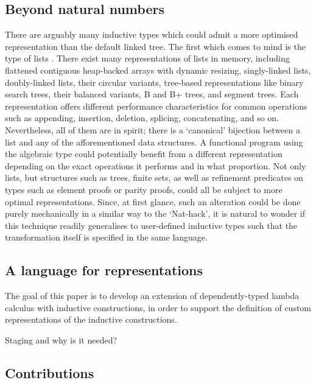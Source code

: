 \subsection{Beyond natural numbers}

There are arguably many inductive types which could admit a more optimised
representation than the default linked tree. The first which comes to mind is
the type of lists . There exist many
representations of lists in memory, including flattened contiguous heap-backed
arrays with dynamic resizing, singly-linked lists, doubly-linked lists, their
circular variants, tree-based representations like binary search trees, their
balanced variants, B and B+ trees, and segment trees. Each representation
offers different performance characteristics for common operations such as
appending, insertion, deletion, splicing, concatenating, and so on.
Nevertheless, all of them are  in spirit; there is a `canonical'
bijection between a list and any of the afforementioned data structures. A
functional program using the algebraic  type could potentially
benefit from a different representation depending on the exact operations it
performs and in what proportion. Not only lists, but structures such as trees,
finite sets, as well as refinement predicates on types such as element proofs
or parity proofs, could all be subject to more optimal representations. Since,
at first glance, such an alteration could be done purely mechanically in a
similar way to the `Nat-hack', it is natural to wonder if this technique
readily generalises to user-defined inductive types such that the
transformation itself is specified in the same language.

\subsection{A language for representations}

The goal of this paper is to develop an extension of dependently-typed lambda
calculus with inductive constructions, in order to support the definition of
custom representations of the inductive constructions.

Staging and why is it needed?

\subsection{Contributions}

